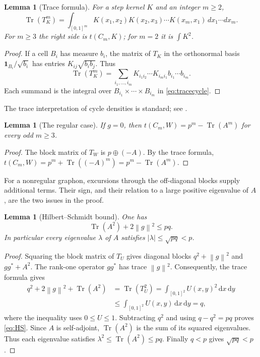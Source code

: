 \documentclass[11pt]{article}
\numberwithin{equation}{section}
\newtheorem{lemma}[theorem]{Lemma}
\newcommand{\Tr}{\operatorname{Tr}}
\newcommand{\one}{\mathbf 1}
\newcommand{\norm}[1]{\left\lVert #1\right\rVert}
\newcommand{\dd}{\,\mathrm d}
\begin{document}
\begin{lemma}[Trace formula]\label{lem:tracecycle}
For a step kernel $K$ and an integer $m\ge2$,
\begin{equation}\label{eq:tracecycle}
 \Tr(T_K^m)=\int_{[0,1]^m}K(x_1,x_2)K(x_2,x_3)\cdots K(x_m,x_1)\,dx_1\cdots dx_m .
\end{equation}
For $m\ge3$ the right side is $t(C_m,K)$; for $m=2$ it is $\int K^2$.
\end{lemma}
\begin{proof}
If a cell $B_i$ has measure $b_i$, the matrix of $T_K$ in the
orthonormal basis $\one_{B_i}/\sqrt{b_i}$ has entries
$K_{ij}\sqrt{b_ib_j}$. Thus
\[
 \Tr(T_K^m)=\sum_{i_1,\ldots,i_m}
 K_{i_1i_2}\cdots K_{i_mi_1}b_{i_1}\cdots b_{i_m}.
\]
Each summand is the integral over
$B_{i_1}\times\cdots\times B_{i_m}$ in \eqref{eq:tracecycle}.
\end{proof}
The trace interpretation of cycle densities is standard; see
\cite{lovasz2012large}.

\begin{lemma}[The regular case]\label{lem:regular-case}
If $g=0$, then $t(C_m,W)=p^m-\Tr(A^m)$ for every odd $m\ge3$.
\end{lemma}
\begin{proof}
The block matrix of $T_W$ is $p\oplus(-A)$. By the trace formula,
$t(C_m,W)=p^m+\Tr((-A)^m)=p^m-\Tr(A^m)$.
\end{proof}
For a nonregular graphon, excursions through the off-diagonal blocks
supply additional terms. Their sign, and their relation to a large
positive eigenvalue of $A$, are the two issues in the proof.

\begin{lemma}[Hilbert--Schmidt bound]\label{lem:HS}
One has
\begin{equation}\label{eq:HS}
 \Tr(A^2)+2\norm g^2\le pq.
\end{equation}
In particular every eigenvalue $\lambda$ of $A$ satisfies $|\lambda|\le\sqrt{pq}<p$.
\end{lemma}
\begin{proof}
Squaring the block matrix of $T_U$ gives diagonal blocks
$q^2+\norm g^2$ and $gg^*+A^2$. The rank-one operator $gg^*$
has trace $\norm g^2$. Consequently, the trace formula gives
\begin{align*}
 q^2+2\norm g^2+\Tr(A^2)
 &=\Tr(T_U^2)
  =\int_{[0,1]^2}U(x,y)^2\dd x\dd y\\
 &\le\int_{[0,1]^2}U(x,y)\dd x\dd y=q,
\end{align*}
where the inequality uses $0\le U\le1$. Subtracting $q^2$ and
using $q-q^2=pq$ proves \eqref{eq:HS}. Since $A$ is self-adjoint,
$\Tr(A^2)$ is the sum of its squared eigenvalues. Thus each
eigenvalue satisfies $\lambda^2\le\Tr(A^2)\le pq$.
Finally $q<p$ gives $\sqrt{pq}<p$.
\end{proof}
\end{document}
